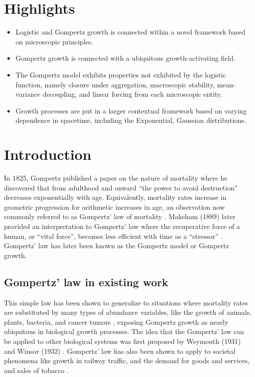 \documentclass{article}
\begin{document}
\section*{Highlights}
\begin{itemize}
\item Logistic and Gompertz growth is connected within a novel framework based on microscopic principles.
\item Gompertz growth is connected with a ubiquitous growth-activating field.
\item The Gompertz model exhibits properties not exhibited by the logistic function, namely closure under aggregation,  macroscopic stability, mean-variance decoupling, and linear forcing from each microscopic entity.
\item Growth processes are put in a larger contextual framework based on varying dependence in spacetime, including the Exponential, Gaussian distributions. 
\end{itemize}

\section{Introduction}

In 1825, Gompertz published a paper on the nature of mortality where he discovered that from adulthood and onward ``the power to avoid destruction'' decreases exponentially with age. Equivalently, mortality rates increase in geometric progression for arithmetic increases in age, an observation now commonly referred to as Gompertz' law of mortality \cite{Gompertz1825}. Makeham (1889) later provided an interpretation to Gompertz' law where the recuperative force of a human, or ``vital force'', becomes less efficient with time as a ``stressor'' \cite{makeham1889further}. Gompertz' law has later been known as the Gompertz model or Gompertz growth. 

\subsection{Gompertz' law in existing work}
This simple law has been shown to generalize to situations where mortality rates are substituted by many types of abundance variables, like the growth of animals, plants, bacteria, and cancer tumors \cite{weymouth1931relative,weymouth1931age,laird1964dynamics,zwietering1990modeling,skinner1994mathematical,starck1998avian,aggrey2002comparison,paine2012fit,benzekry2014classical,halmi2014evaluation,tjorve2010shapes}, exposing Gompertz growth as nearly ubiquitous in biological growth processes. The idea that the Gompertz' law can be applied to other biological systems was first proposed by Weymouth (1931) \cite{weymouth1931relative,weymouth1931age} and Winsor (1932) \cite{Winsor1932}. Gompertz' law has also been shown to apply to societal phenomena like growth in railway traffic, and the demand for goods and services, and sales of tobacco \cite{olshansky1997ever,prescott1922law,peabody1924growth}.
\end{document}
